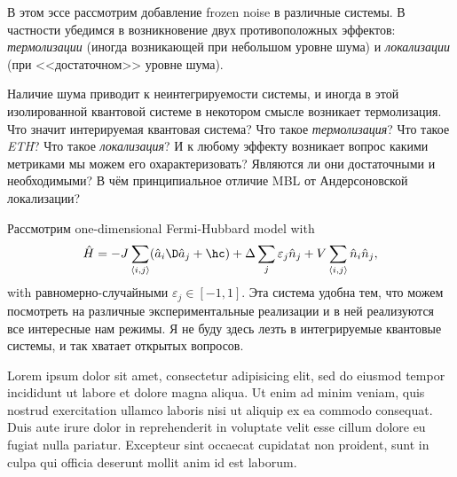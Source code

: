 В этом эссе рассмотрим добавление frozen noise в различные системы.
В частности убедимся в возникновение двух противоположных эффектов: \textit{термолизации} (иногда возникающей при небольшом уровне шума) и \textit{локализации} (при <<достаточном>> уровне шума). 



Наличие шума приводит к неинтегрируемости системы, и иногда в этой изолированной квантовой системе в некотором смысле возникает термолизация. 
Что значит интерируемая квантовая система? Что такое \textit{термолизация}? Что такое \textit{ETH}?
Что такое \textit{локализация}? 
И к любому эффекту возникает вопрос какими метриками мы можем его охарактеризовать? Являются ли они достаточными и необходимыми? В чём принципиальное отличие MBL от Андерсоновской локализации?


	
Рассмотрим one-dimensional Fermi-Hubbard model with 
\begin{equation*}
	\hat{H} = 
	- J \sum_{\langle i,j\rangle} (\hat{a}_i\D \hat{a}_j + \hc) 
	+ \Delta \sum_j \varepsilon_j \hat{n}_j
	+ V \sum_{\langle i,j\rangle} \hat{n}_i \hat{n}_j,
\end{equation*}
with равномерно-случайными $\varepsilon_j \in [-1,1]$. Эта система удобна тем, что можем посмотреть на различные экспериментальные реализации и в ней реализуются все интересные нам режимы. Я не буду здесь лезть в интегрируемые квантовые системы, и так хватает открытых вопросов. 








Lorem ipsum dolor sit amet, consectetur adipisicing elit, sed do eiusmod
tempor incididunt ut labore et dolore magna aliqua. Ut enim ad minim veniam,
quis nostrud exercitation ullamco laboris nisi ut aliquip ex ea commodo
consequat. Duis aute irure dolor in reprehenderit in voluptate velit esse
cillum dolore eu fugiat nulla pariatur. Excepteur sint occaecat cupidatat non
proident, sunt in culpa qui officia deserunt mollit anim id est laborum.




